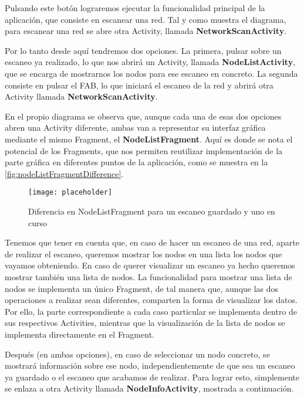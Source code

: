 Pulsando este botón lograremos ejecutar la funcionalidad principal de la aplicación, que consiste en escanear una red. Tal y como muestra el diagrama, para escanear una red se abre otra Activity, llamada \textbf{NetworkScanActivity}.

Por lo tanto desde aquí tendremos dos opciones. La primera, pulsar sobre un escaneo ya realizado, lo que nos abrirá un Activity, llamada \textbf{NodeListActivity}, que se encarga de mostrarnos los nodos para ese escaneo en concreto. La segunda consiste en pulsar el FAB, lo que iniciará el escaneo de la red y abrirá otra Activity llamada \textbf{NetworkScanActivity}.

En el propio diagrama se observa que, aunque cada una de esas dos opciones abren una Activity diferente, ambas van a representar su interfaz gráfica mediante el mismo Fragment, el \textbf{NodeListFragment}. Aquí es donde se nota el potencial de los Fragments, que nos permiten reutilizar implementación de la parte gráfica en diferentes puntos de la aplicación, como se muestra en la \autoref{fig:nodeListFragmentDifference}.

\begin{figure}[H] %
	\centering
	\texttt{[image: placeholder]}
	\caption{Diferencia en NodeListFragment para un escaneo guardado y uno en curso}
	\label{fig:nodeListFragmentDifference}
\end{figure}

Tenemos que tener en cuenta que, en caso de hacer un escaneo de una red, aparte de realizar el escaneo, queremos mostrar los nodos en una lista los nodos que vayamos obteniendo. En caso de querer visualizar un escaneo ya hecho queremos mostrar también una lista de nodos. La funcionalidad para mostrar una lista de nodos se implementa un único Fragment, de tal manera que, aunque las dos operaciones a realizar sean diferentes, comparten la forma de visualizar los datos. Por ello, la parte correspondiente a cada caso particular se implementa dentro de sus respectivos Activities, mientras que la visualización de la lista de nodos se implementa directamente en el Fragment.

Después (en ambas opciones), en caso de seleccionar un nodo concreto, se mostrará información sobre ese nodo, independientemente de que sea un escaneo ya guardado o el escaneo que acabamos de realizar. Para lograr esto, simplemente se enlaza a otra Activity llamada \textbf{NodeInfoActivity}, mostrada a continuación.

